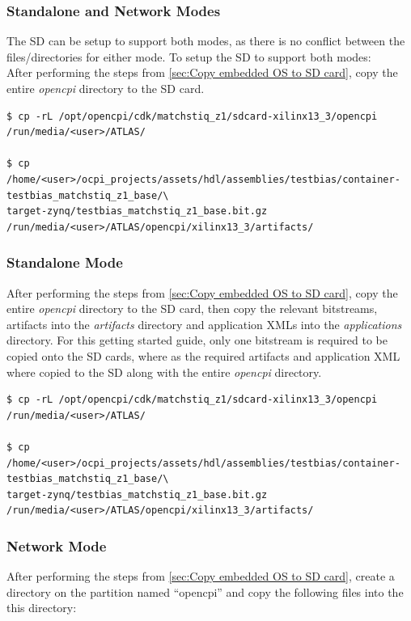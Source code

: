 \subsubsection{Standalone and Network Modes}
The SD can be setup to support both modes, as there is no conflict between the files/directories for either mode. To setup the SD to support both modes:\\

\noindent After performing the steps from \ref{sec:Copy embedded OS to SD card}, copy the entire \textit{opencpi} directory to the SD card.

\begin{verbatim}
$ cp -rL /opt/opencpi/cdk/matchstiq_z1/sdcard-xilinx13_3/opencpi /run/media/<user>/ATLAS/

$ cp /home/<user>/ocpi_projects/assets/hdl/assemblies/testbias/container-testbias_matchstiq_z1_base/\
target-zynq/testbias_matchstiq_z1_base.bit.gz /run/media/<user>/ATLAS/opencpi/xilinx13_3/artifacts/
\end{verbatim}

\subsubsection{Standalone Mode}
After performing the steps from \ref{sec:Copy embedded OS to SD card}, copy the entire \textit{opencpi} directory to the SD card, then copy the relevant bitstreams, artifacts into the \textit{artifacts} directory and application XMLs into the \textit{applications} directory. For this getting started guide, only one bitstream is required to be copied onto the SD cards, where as the required artifacts and application XML where copied to the SD along with the entire \textit{opencpi} directory.

\begin{verbatim}
$ cp -rL /opt/opencpi/cdk/matchstiq_z1/sdcard-xilinx13_3/opencpi /run/media/<user>/ATLAS/

$ cp /home/<user>/ocpi_projects/assets/hdl/assemblies/testbias/container-testbias_matchstiq_z1_base/\
target-zynq/testbias_matchstiq_z1_base.bit.gz /run/media/<user>/ATLAS/opencpi/xilinx13_3/artifacts/
\end{verbatim}

\subsubsection{Network Mode}
After performing the steps from \ref{sec:Copy embedded OS to SD card}, create a directory on the partition named ``opencpi'' and copy the following files into the this directory:

